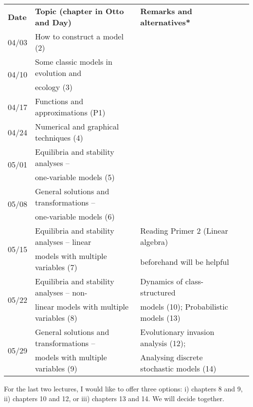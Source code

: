 \documentclass[
	letterpaper,
	12pt
]{article}
\begin{document}
\begin{table}[ht]
	\begin{tabular}{@{\extracolsep{\fill}}llll}
		\textbf{Date} & \textbf{Topic (chapter in Otto and Day)} & \textbf{Remarks and alternatives*} \\
		04/03 & How to construct a model (2) & \\
		
		\multirow{2}{*}{04/10} & Some classic models in evolution and& \multirow{2}{*}{}\\[-0.35cm]
		 & ecology (3) & \\
		
		04/17 & Functions and approximations (P1) &  \\
		
		04/24 & Numerical and graphical techniques (4) & \\
		
		\multirow{2}{*}{05/01} & Equilibria and stability analyses -- & \multirow{2}{*}{}\\[-0.35cm]
		 & one-variable models (5) & \\
		
		\multirow{2}{*}{05/08} & General solutions and transformations -- & \multirow{2}{*}{}\\[-0.35cm]
		 & one-variable models (6) & \\
		
		\multirow{2}{*}{05/15} & Equilibria and stability analyses -- linear & Reading Primer 2 (Linear algebra)\\[-0.35cm]
		 & models with multiple variables (7) & beforehand will be helpful\\
		
		\multirow{2}{*}{05/22} & Equilibria and stability analyses -- non-& Dynamics of class-structured \\[-0.35cm]
		 & linear models with multiple variables (8) & models (10); Probabilistic models (13) \\
		
		\multirow{2}{*}{05/29} & General solutions and transformations -- & Evolutionary invasion analysis (12);\\[-0.35cm]
		 & models with multiple variables (9) & Analysing discrete stochastic models (14) \\
		
	\end{tabular}
\end{table}

\noindent*For the last two lectures, I would like to offer three options: i) chapters 8 and 9, ii) chapters 10 and 12, or iii) chapters 13 and 14. We will decide together.
\end{document}
